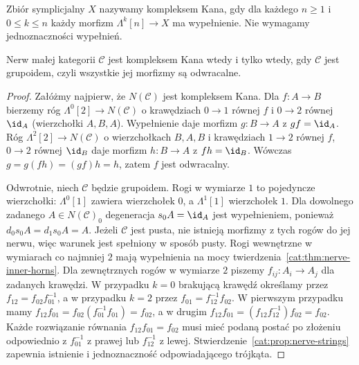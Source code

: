 \begin{definicja}\label{cat:def:kan-complex}
Zbiór symplicjalny $X$ nazywamy kompleksem Kana, gdy dla każdego $n\geq1$ i $0\leq k\leq n$ każdy morfizm $\Lambda^k[n]\to X$ ma wypełnienie. Nie wymagamy jednoznaczności wypełnień.
\end{definicja}

\begin{twierdzenie}\label{cat:thm:nerve-kan-groupoid}
Nerw małej kategorii $\mathcal C$ jest kompleksem Kana wtedy i tylko wtedy, gdy $\mathcal C$ jest grupoidem, czyli wszystkie jej morfizmy są odwracalne.
\end{twierdzenie}
\begin{proof}
Załóżmy najpierw, że $N(\mathcal C)$ jest kompleksem Kana. Dla $f:A\to B$ bierzemy róg $\Lambda^0[2]\to N(\mathcal C)$ o krawędziach $0\to1$ równej $f$ i $0\to2$ równej $\id_A$ (wierzchołki $A,B,A$). Wypełnienie daje morfizm $g:B\to A$ z $gf=\id_A$. Róg $\Lambda^2[2]\to N(\mathcal C)$ o wierzchołkach $B,A,B$ i krawędziach $1\to2$ równej $f$, $0\to2$ równej $\id_B$ daje morfizm $h:B\to A$ z $fh=\id_B$. Wówczas $g=g(fh)=(gf)h=h$, zatem $f$ jest odwracalny.

Odwrotnie, niech $\mathcal C$ będzie grupoidem. Rogi w wymiarze $1$ to pojedyncze wierzchołki: $\Lambda^0[1]$ zawiera wierzchołek $0$, a $\Lambda^1[1]$ wierzchołek $1$. Dla dowolnego zadanego $A\in N(\mathcal C)_0$ degeneracja $s_0A=\id_A$ jest wypełnieniem, ponieważ $d_0s_0A=d_1s_0A=A$. Jeżeli $\mathcal C$ jest pusta, nie istnieją morfizmy z tych rogów do jej nerwu, więc warunek jest spełniony w sposób pusty. Rogi wewnętrzne w wymiarach co najmniej $2$ mają wypełnienia na mocy twierdzenia~\ref{cat:thm:nerve-inner-horns}. Dla zewnętrznych rogów w wymiarze $2$ piszemy $f_{ij}:A_i\to A_j$ dla zadanych krawędzi. W przypadku $k=0$ brakującą krawędź określamy przez $f_{12}=f_{02}f_{01}^{-1}$, a w przypadku $k=2$ przez $f_{01}=f_{12}^{-1}f_{02}$. W pierwszym przypadku mamy $f_{12}f_{01}=f_{02}(f_{01}^{-1}f_{01})=f_{02}$, a w drugim $f_{12}f_{01}=(f_{12}f_{12}^{-1})f_{02}=f_{02}$. Każde rozwiązanie równania $f_{12}f_{01}=f_{02}$ musi mieć podaną postać po złożeniu odpowiednio z $f_{01}^{-1}$ z prawej lub $f_{12}^{-1}$ z lewej. Stwierdzenie~\ref{cat:prop:nerve-strings} zapewnia istnienie i jednoznaczność odpowiadającego trójkąta.


\end{proof}
